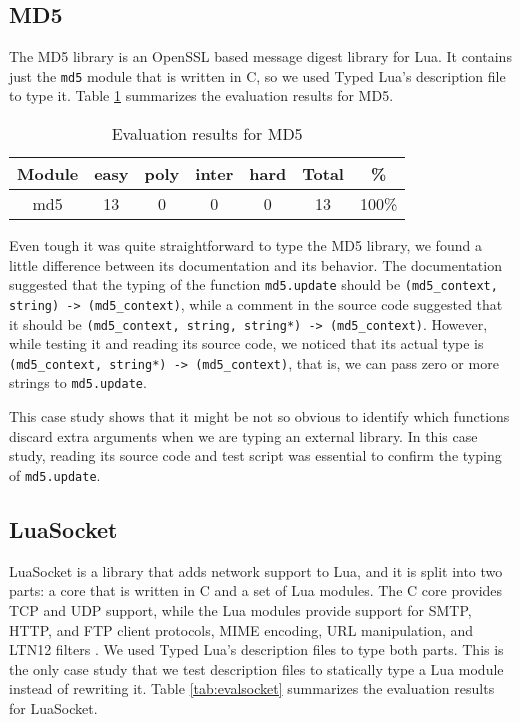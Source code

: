 \subsection{MD5}

The MD5 library is an OpenSSL based message digest library for Lua.
It contains just the \texttt{md5} module that is written in C,
so we used Typed Lua's description file to type it.
Table \ref{tab:evalmd5} summarizes the evaluation results for MD5.

\begin{table}[!ht]
\begin{center}
\begin{tabular}{|c|c|c|c|c|c|c|}
\hline
\textbf{Module} & \textbf{easy} & \textbf{poly} & \textbf{inter} & \textbf{hard} & \textbf{Total} & \textbf{\%} \\
\hline
md5 & 13 & 0 & 0 & 0 & 13 & 100\% \\
\hline
\end{tabular}
\end{center}
\caption{Evaluation results for MD5}
\label{tab:evalmd5}
\end{table}

Even tough it was quite straightforward to type the MD5 library,
we found a little difference between its documentation and its behavior.
The documentation suggested that the typing of the function \texttt{md5.update}
should be \texttt{(md5\string_context, string) -> (md5\string_context)},
while a comment in the source code suggested that it should be
\texttt{(md5\string_context, string, string*) -> (md5\string_context)}.
However, while testing it and reading its source code, we noticed that
its actual type is \texttt{(md5\string_context, string*) -> (md5\string_context)},
that is, we can pass zero or more strings to \texttt{md5.update}.

This case study shows that it might be not so obvious to identify which
functions discard extra arguments when we are typing an external library.
In this case study, reading its source code and test script was essential
to confirm the typing of \texttt{md5.update}.

\subsection{LuaSocket}

LuaSocket is a library that adds network support to Lua,
and it is split into two parts: a core that is written in C and a set of
Lua modules.
The C core provides TCP and UDP support, while the Lua modules provide
support for SMTP, HTTP, and FTP client protocols, MIME encoding,
URL manipulation, and LTN12 filters \citep{nehab2008ltn012}.
We used Typed Lua's description files to type both parts.
This is the only case study that we test description files to statically type
a Lua module instead of rewriting it.
Table \ref{tab:evalsocket} summarizes the evaluation results for LuaSocket.

